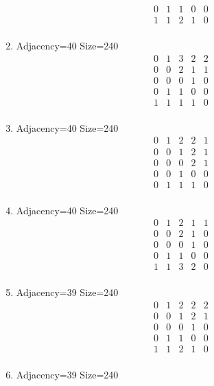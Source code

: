 \documentclass[12pt]{article}
\begin{document}
\begin{multicols}{3}
\begin{enumerate}
\begin{equation*}
\begin{array}{ccccc}
0&1&1&0&0\\
1&1&2&1&0\\
\end{array}
\end{equation*}
\item Adjacency=40 Size=240
\begin{equation*}
\begin{array}{ccccc}
0&1&3&2&2\\
0&0&2&1&1\\
0&0&0&1&0\\
0&1&1&0&0\\
1&1&1&1&0\\
\end{array}
\end{equation*}
\item Adjacency=40 Size=240
\begin{equation*}
\begin{array}{ccccc}
0&1&2&2&1\\
0&0&1&2&1\\
0&0&0&2&1\\
0&0&1&0&0\\
0&1&1&1&0\\
\end{array}
\end{equation*}
\item Adjacency=40 Size=240
\begin{equation*}
\begin{array}{ccccc}
0&1&2&1&1\\
0&0&2&1&0\\
0&0&0&1&0\\
0&1&1&0&0\\
1&1&3&2&0\\
\end{array}
\end{equation*}
\item Adjacency=39 Size=240
\begin{equation*}
\begin{array}{ccccc}
0&1&2&2&2\\
0&0&1&2&1\\
0&0&0&1&0\\
0&1&1&0&0\\
1&1&2&1&0\\
\end{array}
\end{equation*}
\item Adjacency=39 Size=240
\begin{equation*}
\begin{array}{ccccc}

\end{array}
\end{equation*}
\end{enumerate}
\end{multicols}
\end{document}

